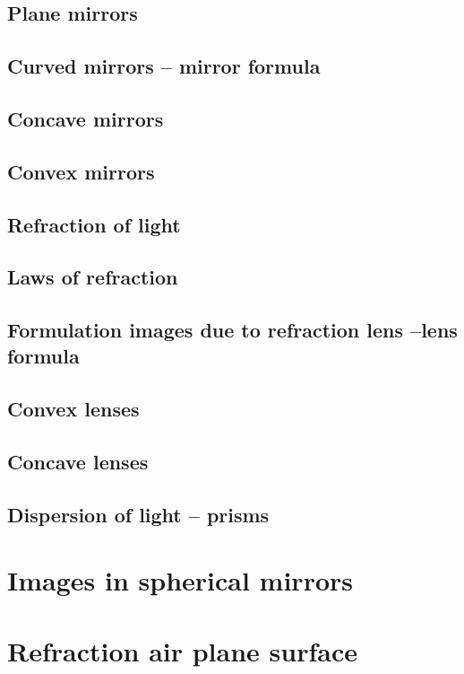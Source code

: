\documentclass{article}
\begin{document}
\subsection{Plane mirrors}
\subsection{Curved mirrors – mirror formula}
\subsection{Concave mirrors}
\subsection{Convex mirrors}
\subsection{Refraction of light}
\subsection{Laws of refraction}
\subsection{Formulation images due to refraction lens –lens formula}
\subsection{Convex lenses}
\subsection{Concave lenses}
\subsection{ Dispersion of light – prisms}

\newpage


\section{Images in spherical mirrors}
\newpage


\section{Refraction air plane surface}
\newpage
\end{document}
